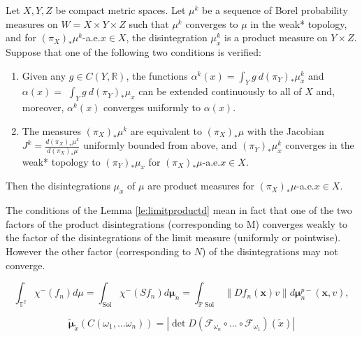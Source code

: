 \documentclass[10pt,a4paper]{amsart}
\newcommand{\Pp}{\mathbb P}
\newcommand{\R}{\mathbb{R}}
\newcommand{\Sol}{\operatorname{Sol}}
\newcommand{\bmu}{\boldsymbol{\mu}}
\newcommand{\bx}{\mathbf{x}}
\newcommand{\cF}{\mathcal{F}}
\newcommand{\fsol}{Sf}
\newcommand{\tx}{\tilde{x}}
\begin{document}
\begin{lemma}\label{le:limitproductd}
Let $X, Y, Z$ be compact metric spaces. Let $\mu^k$ be a sequence of Borel probability measures on $W =X \times Y \times Z$ such that $\mu^k$ converges to $\mu$ in the weak* topology, and for $(\pi_{X})_* \mu^k$-a.e.\@ $x \in X$, the disintegration $\mu_x^k$ is a product measure on $Y \times Z$.\\
Suppose that one of the following two conditions is verified:
\begin{enumerate}

\item
Given any $g \in C(Y, \R)$, the functions $\alpha^k(x) = \int_Y g \ d(\pi_Y)_* \mu_x^k$ and \newline $\alpha(x) =$ $\int_Y g \ d(\pi_Y)_* \mu_x$ can be extended continuously to all of $X$ and, moreover, $\alpha^k(x)$ converges uniformly to $\alpha(x)$. 

\item
The measures $(\pi_{X})_* \mu^k$ are equivalent to $(\pi_{X})_* \mu$ with the Jacobian $J^k=\frac{d(\pi_{X})_* \mu^k}{d(\pi_{X})_* \mu}$ uniformly bounded from above, and $(\pi_Y)_*\mu_x^k$ converges in the weak* topology to $(\pi_Y)_*\mu_x$ for $(\pi_{X})_*\mu$-a.e.\@ $x\in X$.
\end{enumerate}
Then the disintegrations $\mu_x$ of $\mu$ are product measures for $(\pi_{X})_* \mu$-a.e.\@ $x\in X$.
\end{lemma}

\begin{remark}\label{re:product}
The conditions of the Lemma \ref{le:limitproductd} mean in fact that one of the two factors of the product disintegrations (corresponding to M) converges weakly to the factor of the disintegrations of the limit measure (uniformly or pointwise). However the other factor (corresponding to $N$) of the disintegrations may not converge.
\end{remark}

\begin{equation} \label{integrated_negative_luap_exp_2}
\int_{\mathbb T^2}\chi^-(f_n)d\mu=\int_{\Sol}\chi^-(\fsol_n)d\bmu_n= \int_{\Pp \Sol}\|D f_n({\bx}) v\|d\bmu_n^{p-}(\bx,v),
\end{equation}

\begin{equation} \label{boldmutildextilde}
\tilde{\bmu}_{\tx} (C(\omega_1, \ldots \omega_n)) = | \det D (\cF_{\omega_n} \circ \ldots \circ \cF_{\omega_1})(\tx) |
\end{equation}
\end{document}
